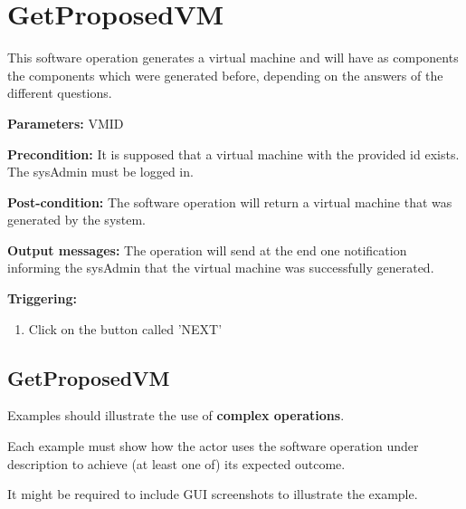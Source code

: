 \section{GetProposedVM}
\label{operation:GetProposedVM}
This software operation generates a virtual machine and will have as components
the components which were generated before, depending on the answers of the
different questions.
\begin{description}

\item \textbf{Parameters:} VMID
\item \textbf{Precondition:} It is supposed that a virtual machine with the
provided id exists. The sysAdmin must be logged in.
\item \textbf{Post-condition:} The software operation will return a virtual
machine that was generated by the system.
\item \textbf{Output messages:} The operation will send at the end one
notification informing the sysAdmin that the virtual machine was successfully
generated.

\item \textbf{Triggering:}
\begin{enumerate}
\item Click on the button called 'NEXT'
\end{enumerate}

 
\end{description}

\subsection{GetProposedVM}
Examples should illustrate the use of \textbf{complex operations}.

Each example must show how the actor uses the software operation under
description to achieve (at least one of) its expected outcome.

It might be required to include GUI screenshots to illustrate the example.

























